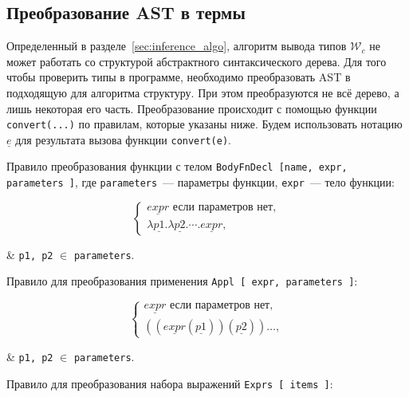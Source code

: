 \subsection{Преобразование AST в термы}
\label{subsec:ast_transformation}

Определенный в разделе~\ref{sec:inference_algo}, алгоритм вывода типов $\mathcal{W}_c$ не может работать со структурой абстрактного синтаксического дерева.
Для того чтобы проверить типы в программе, необходимо преобразовать AST в подходящую для алгоритма структуру.
При этом преобразуются не всё дерево, а лишь некоторая его часть.
Преобразование происходит с помощью функции \lstinline{convert(...)} по правилам, которые указаны ниже.
Будем использовать нотацию $\underline{e}$ для результата вызова функции \lstinline{convert(e)}.

Правило преобразования функции с телом \lstinline{BodyFnDecl [name, expr, parameters ]}, где \lstinline{parameters}~--- параметры функции, \lstinline{expr}~--- тело функции:

\begin{equation*}
    \begin{cases}
        \underline{expr} \text{ если параметров нет}, \\
        \lambda \underline{p1}. \lambda \underline{p2}. \cdots. \underline{expr},
    \end{cases}
\end{equation*}
\begin{eqrem}
    & \texttt{p1, p2} $\in$ \texttt{parameters}.
\end{eqrem}

Правило для преобразования применения \lstinline{Appl [ expr, parameters ]}:

\begin{equation*}
    \begin{cases}
        \underline{expr} \text{ если параметров нет}, \\
        ((\underline{expr}(\underline{p1}))(\underline{p2}))\ldots,
    \end{cases}
\end{equation*}
\begin{eqrem}
    & \texttt{p1, p2} $\in$ \texttt{parameters}.
\end{eqrem}

Правило для преобразования набора выражений \lstinline{Exprs [ items ]}:

